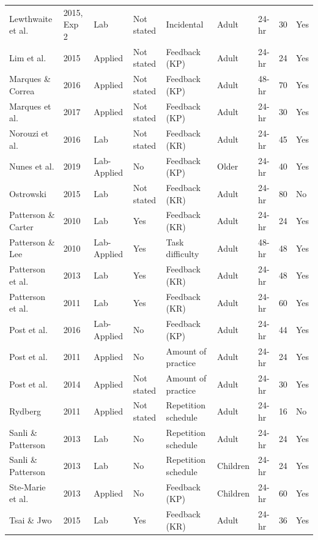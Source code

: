 \documentclass[
  english,
  man,floatsintext]{apa7}
\begin{document}
\begin{landscape}
\begin{ThreePartTable}
\begin{longtable}[l]{lllllllrl}
\addlinespace
Lewthwaite et al. & 2015, Exp 2 & Lab & Not stated & Incidental & Adult & 24-hr & 30 & Yes\\
\addlinespace
Lim et al. & 2015 & Applied & Not stated & Feedback (KP) & Adult & 24-hr & 24 & Yes\\
\addlinespace
Marques \& Correa & 2016 & Applied & Not stated & Feedback (KP) & Adult & 48-hr & 70 & Yes\\
\addlinespace
Marques et al. & 2017 & Applied & Not stated & Feedback (KP) & Adult & 24-hr & 30 & Yes\\
\addlinespace
Norouzi et al. & 2016 & Lab & Not stated & Feedback (KR) & Adult & 24-hr & 45 & Yes\\
\addlinespace
Nunes et al. & 2019 & Lab-Applied & No & Feedback (KP) & Older & 24-hr & 40 & Yes\\
\addlinespace
Ostrowski & 2015 & Lab & Not stated & Feedback (KR) & Adult & 24-hr & 80 & No\\
\addlinespace
Patterson \& Carter & 2010 & Lab & Yes & Feedback (KR) & Adult & 24-hr & 24 & Yes\\
\addlinespace
Patterson \& Lee & 2010 & Lab-Applied & Yes & Task difficulty & Adult & 48-hr & 48 & Yes\\
\addlinespace
Patterson et al. & 2013 & Lab & Yes & Feedback (KR) & Adult & 24-hr & 48 & Yes\\
\addlinespace
Patterson et al. & 2011 & Lab & Yes & Feedback (KR) & Adult & 24-hr & 60 & Yes\\
\addlinespace
Post et al. & 2016 & Lab-Applied & No & Feedback (KP) & Adult & 24-hr & 44 & Yes\\
\addlinespace
Post et al. & 2011 & Applied & No & Amount of practice & Adult & 24-hr & 24 & Yes\\
\addlinespace
Post et al. & 2014 & Applied & Not stated & Amount of practice & Adult & 24-hr & 30 & Yes\\
\addlinespace
Rydberg & 2011 & Applied & Not stated & Repetition schedule & Adult & 24-hr & 16 & No\\
\addlinespace
Sanli \& Patterson & 2013 & Lab & No & Repetition schedule & Adult & 24-hr & 24 & Yes\\
\addlinespace
Sanli \& Patterson & 2013 & Lab & No & Repetition schedule & Children & 24-hr & 24 & Yes\\
\addlinespace
Ste-Marie et al. & 2013 & Applied & No & Feedback (KP) & Children & 24-hr & 60 & Yes\\
\addlinespace
Tsai \& Jwo & 2015 & Lab & Yes & Feedback (KR) & Adult & 24-hr & 36 & Yes\\

\end{longtable}
\end{ThreePartTable}
\end{landscape}
\end{document}
